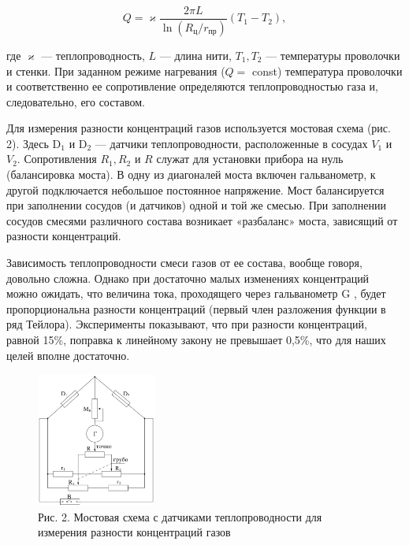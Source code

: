 \documentclass[a4paper,12pt]{article} %
\begin{document}
\begin{equation}
	Q = \varkappa\frac{2\pi L}{\ln{(R_{\text{ц}}/r_{\text{пр}})}}(T_{1} - T_{2}),
\end{equation}



\noindent где $\varkappa$ — теплопроводность, $L$ — длина нити, $T_{1}, T_{2}$ — температуры проволочки и стенки. При заданном режиме нагревания ($Q = $ const) температура проволочки и соответственно ее сопротивление определяются теплопроводностью газа и, следовательно, его составом.



Для измерения разности концентраций газов используется мостовая схема (рис. 2). Здесь D$_{1}$ и D$_{2}$ — датчики теплопроводности, расположенные в сосудах $V_{1}$ и $V_{2}$. Сопротивления $R_{1}, R_{2}$ и $R$ служат для установки прибора на нуль (балансировка моста). В одну из диагоналей моста включен гальванометр, к другой подключается небольшое постоянное напряжение. Мост балансируется при заполнении сосудов (и датчиков) одной и той же смесью. При заполнении сосудов смесями различного состава возникает «разбаланс» моста, зависящий от разности концентраций.


Зависимость теплопроводности смеси газов от ее состава, вообще говоря, довольно сложна. Однако при достаточно малых изменениях концентраций можно ожидать, что величина тока, проходящего через гальванометр G , будет пропорциональна разности концентраций (первый член разложения функции в ряд Тейлора). Эксперименты показывают, что при разности концентраций, равной 15\%, поправка к линейному закону не превышает 0,5\%, что для наших целей вполне достаточно.

\begin{figure}
	\includegraphics[width=0.35\textwidth]{Рис2.png}
	\caption*{\footnotesize{Рис. 2. Мостовая схема с датчиками теплопроводности для измерения разности концентраций газов}}
\end{figure}
\end{document}
